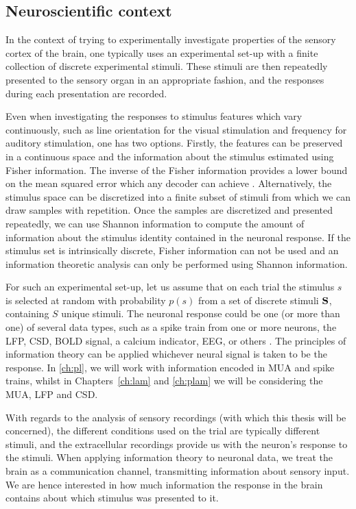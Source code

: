 \subsection{Neuroscientific context}

In the context of trying to experimentally investigate properties of the sensory cortex of the brain, one typically uses an experimental set-up with a finite collection of discrete experimental stimuli.
These stimuli are then repeatedly presented to the sensory organ in an appropriate fashion, and the responses during each presentation are recorded.

Even when investigating the responses to stimulus features which vary continuously, such as line orientation for the visual stimulation and frequency for auditory stimulation, one has two options.
Firstly, the features can be preserved in a continuous space and the information about the stimulus estimated using Fisher information. The inverse of the Fisher information provides a lower bound on the mean squared error which any decoder can achieve \citep{Quiroga2009}.
Alternatively, the stimulus space can be discretized into a finite subset of stimuli from which we can draw samples with repetition.
Once the samples are discretized and presented repeatedly, we can use Shannon information to compute the amount of information about the stimulus identity contained in the neuronal response.
If the stimulus set is intrinsically discrete, Fisher information can not be used and an information theoretic analysis can only be performed using Shannon information.

For such an experimental set-up, let us assume that on each trial the stimulus $s$ is selected at random with probability $p(s)$ from a set of discrete stimuli $\mathbf{S}$, containing $S$ unique stimuli.
The neuronal response could be one (or more than one) of several data types, such as a spike train from one or more neurons, the \ac{LFP}, \ac{CSD}, \ac{BOLD} signal, a calcium indicator, \ac{EEG}, or others \citep{Magri2009,Quiroga2009}.
The principles of information theory can be applied whichever neural signal is taken to be the response.
In \autoref{ch:pl}, we will work with information encoded in \ac{MUA} and spike trains, whilst in Chapters~\ref{ch:lam} and \ref{ch:plam} we will be considering the \ac{MUA}, \ac{LFP} and \ac{CSD}.

With regards to the analysis of sensory recordings (with which this thesis will be concerned), the different conditions used on the trial are typically different stimuli, and the extracellular recordings provide us with the neuron's response to the stimuli.
When applying information theory to neuronal data, we treat the brain as a communication channel, transmitting information about sensory input.
We are hence interested in how much information the response in the brain contains about which stimulus was presented to it.

